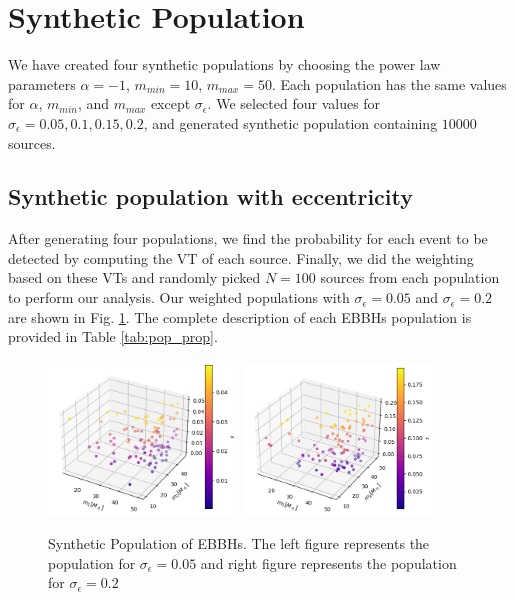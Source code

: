 \documentclass[twocolumn,prd,nofootinbib]{revtex4}
\begin{document}
\section{Synthetic Population}
\label{sec:syn_pop}
We have created four synthetic populations by choosing the power law parameters $\alpha = -1$, $m_{min} = 10$, $m_{max}=50$. Each population has the same values for $\alpha$, $m_{min}$, and $m_{max}$ except $\sigma_\epsilon$. We selected four values for $\sigma_\epsilon = 0.05, 0.1, 0.15, 0.2$, and  generated synthetic population containing $10000$ sources.

\subsection{Synthetic population with eccentricity}

After generating four populations, we find the probability for each event to be detected by computing the VT of each source. Finally, we did the weighting based on these VTs and randomly picked $N=100$ sources from each population to perform our analysis. Our weighted populations with $\sigma_\epsilon=0.05$ and $\sigma_\epsilon=0.2$ are shown in Fig. \ref{fig:pop3d0.05_0.2}.  The complete description of each EBBHs population is provided in Table \ref{tab:pop_prop}.

\begin{figure}[]
\includegraphics[width=0.45\textwidth]{paper/figures/pop3d_0.05.png}
\includegraphics[width=0.45\textwidth]{paper/figures/pop3d_0.2.png}
\caption{\label{fig:pop3d0.05_0.2} Synthetic Population of EBBHs. The left figure represents the population for $\sigma_\epsilon=0.05$ and right figure represents the population for $\sigma_\epsilon=0.2$}
\end{figure}
\end{document}
